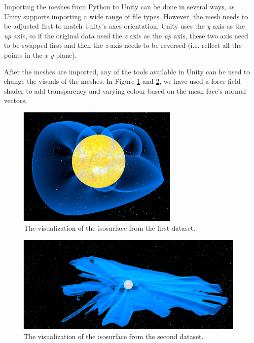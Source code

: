 \documentclass[a4paper,10pt]{report}
\begin{document}
Importing the meshes from Python to Unity can be done in several ways, as Unity supports importing a wide range of file types. However, the mesh needs to be adjusted first to match Unity's axes orientation. Unity uses the \textit{y} axis as the \textit{up} axis, so if the original data used the \textit{z} axis as the \textit{up} axis, these two axis need to be swapped first and then the \textit{z} axis needs to be reversed (i.e. reflect all the points in the \textit{x-y} plane).

After the meshes are imported, any of the tools available in Unity can be used to change the visuals of the meshes. In Figure \ref{fig:Dataset1_Unity} and \ref{fig:Dataset2_Unity}, we have used a force field shader to add transparency and varying colour based on the mesh face's normal vectors.

\begin{figure}[H]
    \centering
    \includegraphics[width=0.7\textwidth]{../images/3D/Dataset1_Unity.png}
    \caption{The visualization of the isosurface from the first dataset.}
    \label{fig:Dataset1_Unity}
\end{figure}
\begin{figure}[H]
    \centering
    \includegraphics[width=\textwidth]{../images/3D/Dataset2_Unity.png}
    \caption{The visualization of the isosurface from the second dataset.}
    \label{fig:Dataset2_Unity}
\end{figure}
\end{document}
